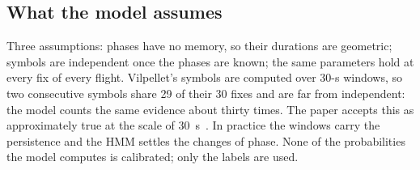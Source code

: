 \subsection{What the model assumes}\label{sec:assumptions}

Three assumptions: phases have no memory, so their durations are geometric; symbols are
independent once the phases are known; the same parameters hold at every fix of every flight.
Vilpellet's symbols are computed over 30-s windows, so two consecutive symbols share 29 of their
30 fixes and are far from independent: the model counts the same evidence about thirty times. The
paper accepts this as approximately true at the scale of 30~s~\cite{vilpellet2026}. In practice
the windows carry the persistence and the HMM settles the changes of phase. None of the
probabilities the model computes is calibrated; only the labels are used.
